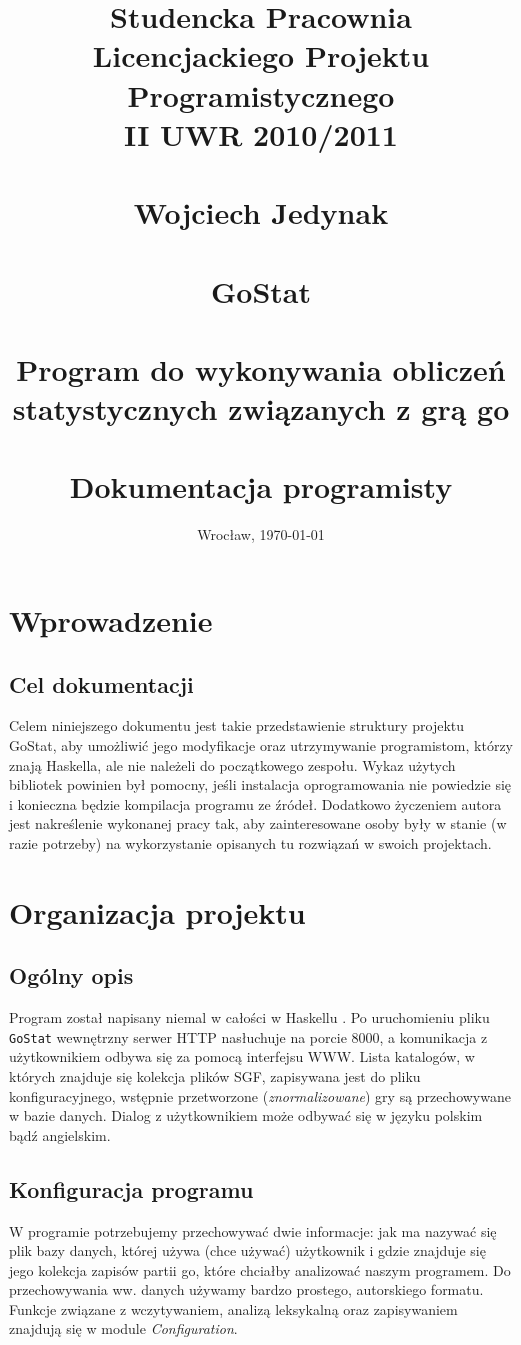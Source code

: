 \documentclass[10pt,leqno]{article}
\title{\normalsize \textbf{Studencka Pracownia Licencjackiego Projektu Programistycznego} \\
       \textbf{II UWR 2010/2011} \\ 
       \ \\
       \vspace{15em}
       \Large Wojciech Jedynak \\
       \normalsize \ \\
       \Huge GoStat \\
       \tiny \ \\
       \LARGE \textbf{Program do wykonywania obliczeń} \\
              \textbf{statystycznych związanych z grą go} \\ 
       \ \\
       \Large Dokumentacja programisty \\
       \vspace{15em}
       }
\date{Wrocław, \today}
\newcommand{\cmd}[1]{
  \texttt{#1}
}
\begin{document}
\maketitle 
\thispagestyle{empty}

\newpage

\tableofcontents

\newpage

\section{Wprowadzenie}

\subsection{Cel dokumentacji}
Celem niniejszego dokumentu jest takie przedstawienie struktury projektu GoStat, aby umożliwić jego modyfikacje oraz utrzymywanie programistom, którzy
znają Haskella, ale nie należeli do początkowego zespołu. Wykaz użytych bibliotek powinien był pomocny, jeśli instalacja oprogramowania nie powiedzie 
się i konieczna będzie kompilacja programu ze źródeł. Dodatkowo życzeniem autora jest nakreślenie wykonanej pracy tak, aby zainteresowane osoby
były w stanie (w razie potrzeby) na wykorzystanie opisanych tu rozwiązań w swoich projektach.

\section{Organizacja projektu}

\subsection{Ogólny opis}
Program został napisany niemal w całości w Haskellu \cite{haskell}. 
Po uruchomieniu pliku \cmd{GoStat} wewnętrzny serwer HTTP nasłuchuje na porcie 8000, 
a komunikacja z użytkownikiem odbywa się za pomocą interfejsu WWW. 
Lista katalogów, w których znajduje się kolekcja plików SGF, zapisywana jest do pliku konfiguracyjnego,
wstępnie przetworzone (\emph{znormalizowane}) gry są przechowywane w bazie danych. Dialog z użytkownikiem może odbywać się w języku
polskim bądź angielskim.

\subsection{Konfiguracja programu}

W programie potrzebujemy przechowywać dwie informacje: jak ma nazywać się plik bazy danych, której używa (chce używać) użytkownik i 
gdzie znajduje się jego kolekcja zapisów partii go, które chciałby analizować naszym programem.
 Do przechowywania ww. danych używamy bardzo prostego, 
autorskiego formatu. Funkcje związane z wczytywaniem, analizą leksykalną oraz zapisywaniem znajdują się w module \emph{Configuration}.
\end{document}
